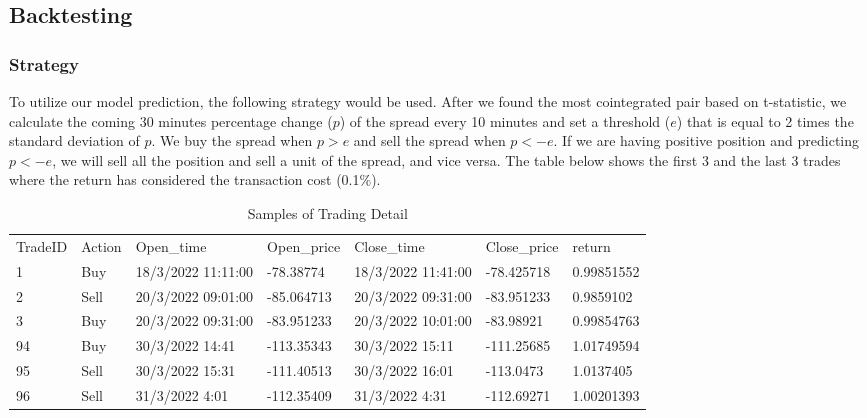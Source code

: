 \documentclass[11pt,a4paper]{article}
\begin{document}
    
    \subsection{Backtesting}
    
    \subsubsection{Strategy}
    To utilize our model prediction, the following strategy would be used. After we found the most cointegrated pair based on t-statistic, we calculate the coming 30 minutes percentage change ($p$) of the spread every 10 minutes and set a threshold ($e$) that is equal to 2 times the standard deviation of $p$. We buy the spread when $p > e$ and sell the spread when $p < -e$. If we are having positive position and predicting $p < -e$, we will sell all the position and sell a unit of the spread, and vice versa. The table below shows the first 3 and the last 3 trades where the return has considered the transaction cost (0.1\%). 
    \begin{table}[H]
        \centering
        \begin{tabular}{lllllll}
            TradeID & Action & Open\_time         & Open\_price & Close\_time        & Close\_price & return     \\
            1       & Buy    & 18/3/2022 11:11:00 & -78.38774   & 18/3/2022 11:41:00 & -78.425718   & 0.99851552 \\
            2       & Sell   & 20/3/2022 09:01:00 & -85.064713  & 20/3/2022 09:31:00 & -83.951233   & 0.9859102  \\
            3       & Buy    & 20/3/2022 09:31:00 & -83.951233  & 20/3/2022 10:01:00 & -83.98921    & 0.99854763 \\
            94      & Buy    & 30/3/2022 14:41    & -113.35343  & 30/3/2022 15:11    & -111.25685   & 1.01749594 \\
            95      & Sell   & 30/3/2022 15:31    & -111.40513  & 30/3/2022 16:01    & -113.0473    & 1.0137405  \\
            96      & Sell   & 31/3/2022 4:01     & -112.35409  & 31/3/2022 4:31     & -112.69271   & 1.00201393
        \end{tabular}
        \caption{Samples of Trading Detail}
        \label{tab:crypto_trading}
    \end{table}
    
\end{document}
